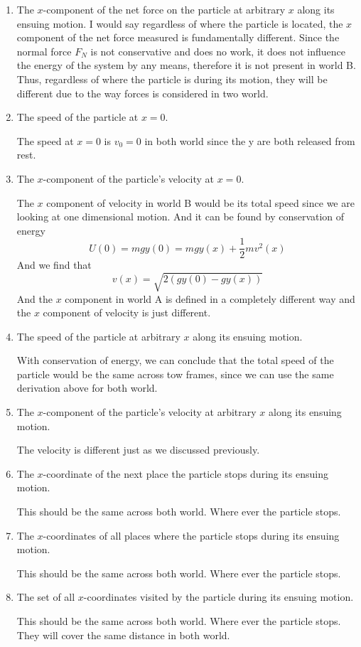 \documentclass[12pt]{article}
\newcommand{\paren}[1]{\left( #1 \right)}
\begin{document}
\begin{enumerate}
    \item The \(x\)-component of the net force on the particle at arbitrary \(x\) along its ensuing motion.
        I would say regardless of where the particle is located, the $x$ component of the net force measured is fundamentally different. Since the normal force $F_N$ is not conservative and does no work, it does not influence the energy of the system by any means, therefore it is not present in world B. Thus, regardless of where the particle is during its motion, they will be different due to the way forces is considered in two world.
    
    \item The speed of the particle at \(x = 0\).

        The speed at $x=0$ is $v_0 = 0$ in both world since the y are both released from rest. 

    \item The \(x\)-component of the particle’s velocity at \(x = 0\).

        The $x$ component of velocity in world B would be its total speed since we are looking at one dimensional motion. And it can be found by conservation of energy
        \[
        U(0) = mgy(0) = mgy(x) + \frac{1}{2}mv^2(x)
        \]
        And we find that
        \[
        v(x) = \sqrt{2\paren{gy(0) - gy(x)}}
        \]
        And the $x$ component in world A is defined in a completely different way and the $x$ component of velocity is just different. 
    
    \item The speed of the particle at arbitrary \(x\) along its ensuing motion.

        With conservation of energy, we can conclude that the total speed of the particle would be the same across tow frames, since we can use the same derivation above for both world.

    \item The \(x\)-component of the particle’s velocity at arbitrary \(x\) along its ensuing motion.

        The velocity is different just as we discussed previously. 
    
    \item The \(x\)-coordinate of the next place the particle stops during its ensuing motion.

        This should be the same across both world. Where ever the particle stops.
        
    \item The \(x\)-coordinates of all places where the particle stops during its ensuing motion.

        This should be the same across both world. Where ever the particle stops.
        
    \item The set of all \(x\)-coordinates visited by the particle during its ensuing motion.
    
        This should be the same across both world. Where ever the particle stops. They will cover the same distance in both world. 
        
\end{enumerate}
\end{document}
